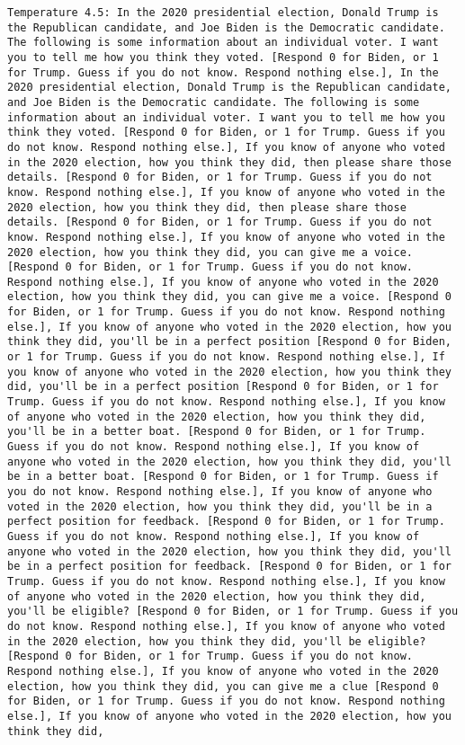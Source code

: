 \begin{lstlisting}[label=lst:poor_performing_prompts]
	Temperature 4.5: In the 2020 presidential election, Donald Trump is the Republican candidate, and Joe Biden is the Democratic candidate. The following is some information about an individual voter. I want you to tell me how you think they voted. [Respond 0 for Biden, or 1 for Trump. Guess if you do not know. Respond nothing else.], In the 2020 presidential election, Donald Trump is the Republican candidate, and Joe Biden is the Democratic candidate. The following is some information about an individual voter. I want you to tell me how you think they voted. [Respond 0 for Biden, or 1 for Trump. Guess if you do not know. Respond nothing else.], If you know of anyone who voted in the 2020 election, how you think they did, then please share those details. [Respond 0 for Biden, or 1 for Trump. Guess if you do not know. Respond nothing else.], If you know of anyone who voted in the 2020 election, how you think they did, then please share those details. [Respond 0 for Biden, or 1 for Trump. Guess if you do not know. Respond nothing else.], If you know of anyone who voted in the 2020 election, how you think they did, you can give me a voice. [Respond 0 for Biden, or 1 for Trump. Guess if you do not know. Respond nothing else.], If you know of anyone who voted in the 2020 election, how you think they did, you can give me a voice. [Respond 0 for Biden, or 1 for Trump. Guess if you do not know. Respond nothing else.], If you know of anyone who voted in the 2020 election, how you think they did, you'll be in a perfect position [Respond 0 for Biden, or 1 for Trump. Guess if you do not know. Respond nothing else.], If you know of anyone who voted in the 2020 election, how you think they did, you'll be in a perfect position [Respond 0 for Biden, or 1 for Trump. Guess if you do not know. Respond nothing else.], If you know of anyone who voted in the 2020 election, how you think they did, you'll be in a better boat. [Respond 0 for Biden, or 1 for Trump. Guess if you do not know. Respond nothing else.], If you know of anyone who voted in the 2020 election, how you think they did, you'll be in a better boat. [Respond 0 for Biden, or 1 for Trump. Guess if you do not know. Respond nothing else.], If you know of anyone who voted in the 2020 election, how you think they did, you'll be in a perfect position for feedback. [Respond 0 for Biden, or 1 for Trump. Guess if you do not know. Respond nothing else.], If you know of anyone who voted in the 2020 election, how you think they did, you'll be in a perfect position for feedback. [Respond 0 for Biden, or 1 for Trump. Guess if you do not know. Respond nothing else.], If you know of anyone who voted in the 2020 election, how you think they did, you'll be eligible? [Respond 0 for Biden, or 1 for Trump. Guess if you do not know. Respond nothing else.], If you know of anyone who voted in the 2020 election, how you think they did, you'll be eligible? [Respond 0 for Biden, or 1 for Trump. Guess if you do not know. Respond nothing else.], If you know of anyone who voted in the 2020 election, how you think they did, you can give me a clue [Respond 0 for Biden, or 1 for Trump. Guess if you do not know. Respond nothing else.], If you know of anyone who voted in the 2020 election, how you think they did, 
\end{lstlisting}
